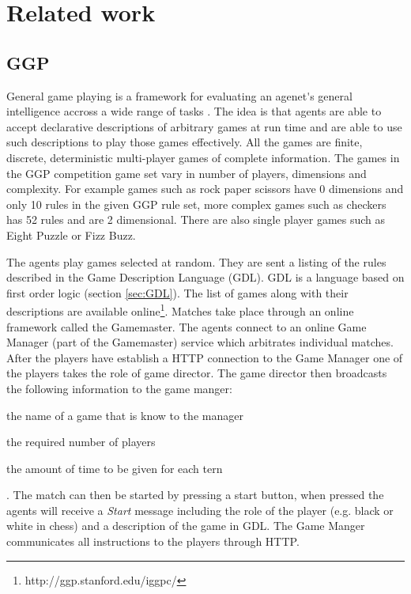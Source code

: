 \chapter{Related work}

\section{GGP}

General game playing is a framework for evaluating an \ac{agenet's} general intelligence \ac{accross} a wide range of tasks \cite{Cropper/IGGP,Genesereth/GGPOverview}. The idea is that agents are able to accept declarative descriptions of arbitrary games at run time and are able to use such descriptions to play those games effectively. All the games are finite, discrete, deterministic multi-player games of complete information\cite{GDL_Spec}. The games in the GGP competition game set vary in number of players, dimensions and complexity. For example games such as rock paper scissors have 0 dimensions and only 10 rules in the given GGP rule set, more complex games such as checkers has 52 rules and are 2 dimensional. There are also single player games such as Eight Puzzle or Fizz Buzz.

The agents play games selected at random. They are sent a listing of the rules described in the Game Description Language (GDL). GDL is a language based on first order logic (section \ref{sec:GDL}). The list of games along with their descriptions are available online\footnote{http://ggp.stanford.edu/iggpc/}. Matches take place through an online framework called the Gamemaster. The agents connect to an online Game Manager (part of the Gamemaster) service which arbitrates individual matches. After the players have establish a HTTP connection to the Game Manager one of the players takes the role of game director. The game director then broadcasts the following information to the game manger: \begin{enumerate*}[label={\arabic*)}]
	\item the name of a game that is know to the manager
	\item the required number of players
	\item the amount of time to be given for each tern
\end{enumerate*}. The match can then be started by pressing a start button, when pressed the agents will receive a \textit{Start} message including the role of the player (e.g. black or white in chess) and a description of the game in GDL. The Game Manger communicates all instructions to the players through HTTP\cite{Genesereth/GGPOverview}.

